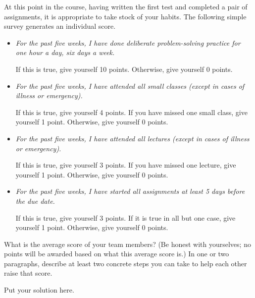 \documentclass{exam}
\begin{document}
\begin{questions}

\question At this point in the course, having written the first test and completed a pair of assignments, it is appropriate to take stock of your habits. The following simple survey generates an individual score.

\begin{itemize}
    \item \textit{For the past five weeks, I have done deliberate problem-solving practice for one hour a day, six days a week.}
    
    If this is true, give yourself 10 points. Otherwise, give yourself 0 points.

\item \textit{For the past five weeks, I have attended all small classes (except in cases of illness or emergency).}

    If this is true, give yourself 4 points. If you have missed one small class, give yourself 1 point. Otherwise, give yourself 0 points.
    
\item \textit{For the past five weeks, I have attended all lectures (except in cases of illness or emergency).}

    If this is true, give yourself 3 points. If you have missed one lecture, give yourself 1 point. Otherwise, give yourself 0 points.

\item \textit{For the past five weeks, I have started all assignments at least 5 days before the due date.}

    If this is true, give yourself 3 points. If it is true in all but one case, give yourself 1 point. Otherwise, give yourself 0 points.
    
\end{itemize}

What is the average score of your team members? (Be honest with yourselves; no points will be awarded based on what this average score is.) In one or two paragraphs, describe at least two concrete steps you can take to help each other raise that score.

    \begin{solution}
        Put your solution here.
    \end{solution}

\end{questions}


\noindent\hrulefill
\end{document}
